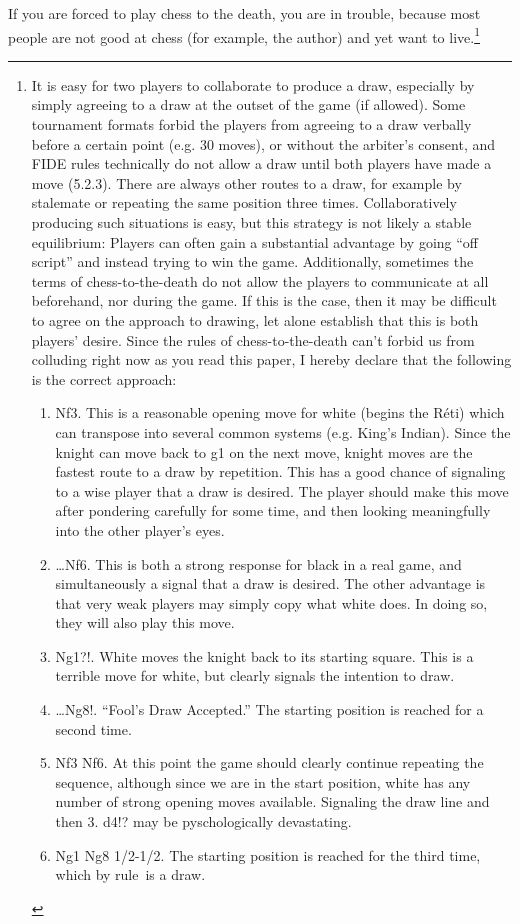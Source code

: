 \documentclass[twocolumn]{article}
\begin{document}
If you are forced to play chess to the death, you are in trouble,
because most people are not good at chess (for example, the author)
and yet want to live.\footnote{It is easy for two players to
  collaborate to produce a draw, especially by simply agreeing to a
  draw at the outset of the game (if allowed). Some tournament formats
  forbid the players from agreeing to a draw verbally before a certain
  point (e.g. 30 moves), or without the arbiter's consent, and FIDE
  rules technically do not allow a draw until both players have made a
  move (5.2.3). There are always other routes to a draw, for example
  by stalemate or repeating the same position three times.
  Collaboratively producing such situations is easy, but this strategy
  is not likely a stable equilibrium: Players can often gain a
  substantial advantage by going ``off script'' and instead trying to
  win the game. Additionally, sometimes the terms of
  chess-to-the-death do not allow the players to communicate at all
  beforehand, nor during the game. If this is the case, then it may be
  difficult to agree on the approach to drawing, let alone establish
  that this is both players' desire. Since the rules of
  chess-to-the-death can't forbid us from colluding right now as you
  read this paper, I hereby declare that the following is the correct
  approach:
\begin{enumerate}[label=\arabic*.]
  \item[1.] Nf3. This is a reasonable opening move for white (begins the R\'eti)
    which can transpose into several common systems (e.g. King's
    Indian). Since the knight can move back to g1 on the next move,
    knight moves are the fastest route to a draw by repetition. This
    has a good chance of signaling to a wise player that a draw is
    desired. The player should make this move after pondering carefully
    for some time, and then looking meaningfully into the other player's
    eyes. 
  \item[1.] \ldots Nf6. This is both a strong response for black in a real game,
    and simultaneously a signal that a draw is desired. The other
    advantage is that very weak players may simply copy what white does.
    In doing so, they will also play this move. 
  \item[2.] Ng1?!. White moves the knight back to its starting square.
    This is a terrible move for white, but clearly signals the intention to
    draw.
  \item[2.] \ldots Ng8!. ``Fool's Draw Accepted.'' The starting position is reached
    for a second time.
  \item[3.] Nf3 Nf6. At this point the game should clearly continue repeating
    the sequence, although since we are in the start position, white has
    any number of strong opening moves available. Signaling the draw line
    and then 3. d4!? may be pyschologically devastating.
  \item[4.] Ng1 Ng8 1/2-1/2. The starting position is reached for the third
    time, which by rule\footnotemark\ is a draw.
\end{enumerate}

}
\end{document}
